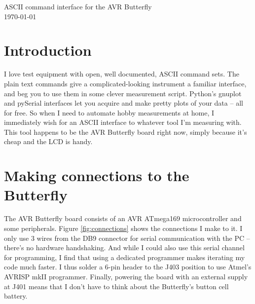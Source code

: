 
\graphicspath{
              {figs/} %
              {pngs/} %
}

\newcommand{\isdraft}{1} %







\begin{center}
	{\huge ASCII command interface for the AVR Butterfly}\\
	\today
\end{center}

\tableofcontents

\section{Introduction}
I love test equipment with open, well documented, ASCII command sets.  The plain text commands give a complicated-looking instrument a familiar interface, and beg you to use them in some clever measurement script.  Python's gnuplot and pySerial interfaces let you acquire and make pretty plots of your data -- all for free\cite{pyserial,gnuplot-py}. So when I need to automate hobby measurements at home, I immediately wish for an ASCII interface to whatever tool I'm measuring with.  This tool happens to be the AVR Butterfly board right now, simply because it's cheap and the LCD is handy.  

\clearpage
\section{Making connections to the Butterfly}
The AVR Butterfly board consists of an AVR ATmega169 microcontroller and some peripherals.  Figure \ref{fig:connections} shows the connections I make to it.  I only use 3 wires from the DB9 connector for serial communication with the PC -- there's no hardware handshaking.  And while I could also use this serial channel for programming, I find that using a dedicated programmer makes iterating my code much faster.  I thus solder a 6-pin header to the J403 position to use Atmel's AVRISP mkII programmer.  Finally, powering the board with an external supply at J401 means that I don't have to think about the Butterfly's button cell battery.  

